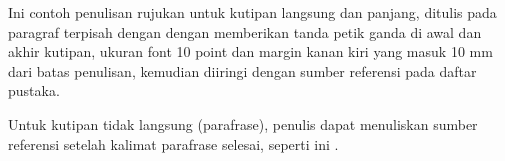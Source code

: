 \begin{kutipanpanjang}
Ini contoh penulisan rujukan untuk kutipan langsung dan panjang, ditulis pada
paragraf terpisah dengan dengan memberikan tanda petik ganda di awal dan akhir
kutipan, ukuran font 10 point dan margin kanan kiri yang masuk 10 mm dari batas
penulisan, kemudian diiringi dengan sumber referensi pada daftar pustaka.
\end{kutipanpanjang}

Untuk kutipan tidak langsung (parafrase), penulis dapat menuliskan sumber
referensi setelah kalimat parafrase selesai, seperti ini \cite{penulis2015online}.
